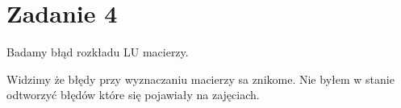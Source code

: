 \section{Zadanie 4}
Badamy błąd rozkładu LU macierzy.

\begin{center}
\end{center}

\noindent
Widzimy że błędy przy wyznaczaniu macierzy sa znikome. Nie byłem w stanie odtworzyć błędów które się pojawiały na zajęciach. 